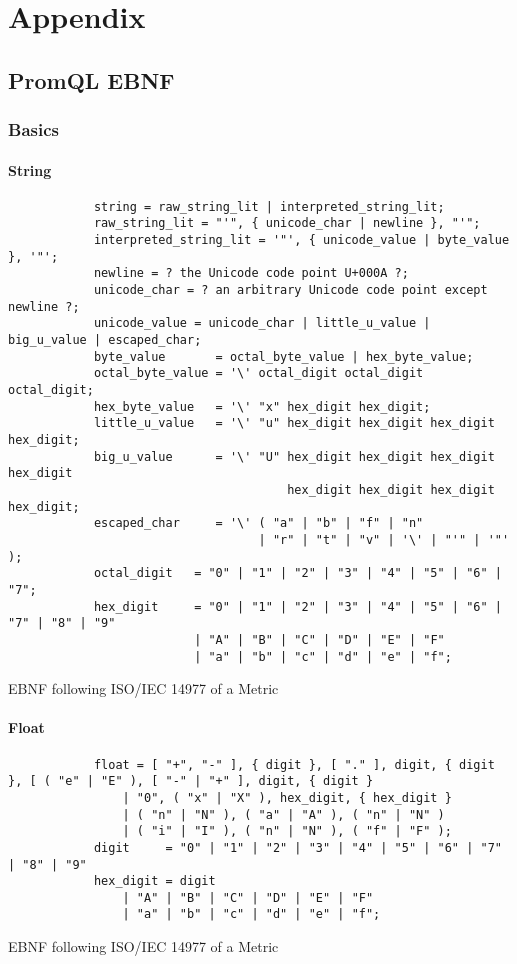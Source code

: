 \chapter{Appendix}
\section{PromQL EBNF}
\subsection{Basics}
\subsubsection{String}
\begin{listing}[H]
	\begin{samepage}
		\begin{verbatim}
			string = raw_string_lit | interpreted_string_lit;
			raw_string_lit = "'", { unicode_char | newline }, "'";
			interpreted_string_lit = '"', { unicode_value | byte_value }, '"';
			newline = ? the Unicode code point U+000A ?;
			unicode_char = ? an arbitrary Unicode code point except newline ?;
			unicode_value = unicode_char | little_u_value | big_u_value | escaped_char;
			byte_value       = octal_byte_value | hex_byte_value;
			octal_byte_value = '\' octal_digit octal_digit octal_digit;
			hex_byte_value   = '\' "x" hex_digit hex_digit;
			little_u_value   = '\' "u" hex_digit hex_digit hex_digit hex_digit;
			big_u_value      = '\' "U" hex_digit hex_digit hex_digit hex_digit
			                           hex_digit hex_digit hex_digit hex_digit;
			escaped_char     = '\' ( "a" | "b" | "f" | "n" 
			                       | "r" | "t" | "v" | '\' | "'" | '"' );
			octal_digit   = "0" | "1" | "2" | "3" | "4" | "5" | "6" | "7";
			hex_digit     = "0" | "1" | "2" | "3" | "4" | "5" | "6" | "7" | "8" | "9"
					      | "A" | "B" | "C" | "D" | "E" | "F"
					      | "a" | "b" | "c" | "d" | "e" | "f";
		\end{verbatim}
		\caption{EBNF following ISO/IEC 14977 of a Metric}
	\end{samepage}
\end{listing}

\subsubsection{Float}
\begin{listing}[H]
	\begin{samepage}
		\begin{verbatim}
			float = [ "+", "-" ], { digit }, [ "." ], digit, { digit }, [ ( "e" | "E" ), [ "-" | "+" ], digit, { digit }
				| "0", ( "x" | "X" ), hex_digit, { hex_digit }
				| ( "n" | "N" ), ( "a" | "A" ), ( "n" | "N" )
				| ( "i" | "I" ), ( "n" | "N" ), ( "f" | "F" );
			digit     = "0" | "1" | "2" | "3" | "4" | "5" | "6" | "7" | "8" | "9"
			hex_digit = digit
				| "A" | "B" | "C" | "D" | "E" | "F"
				| "a" | "b" | "c" | "d" | "e" | "f";
		\end{verbatim}
		\caption{EBNF following ISO/IEC 14977 of a Metric}
	\end{samepage}
\end{listing}


